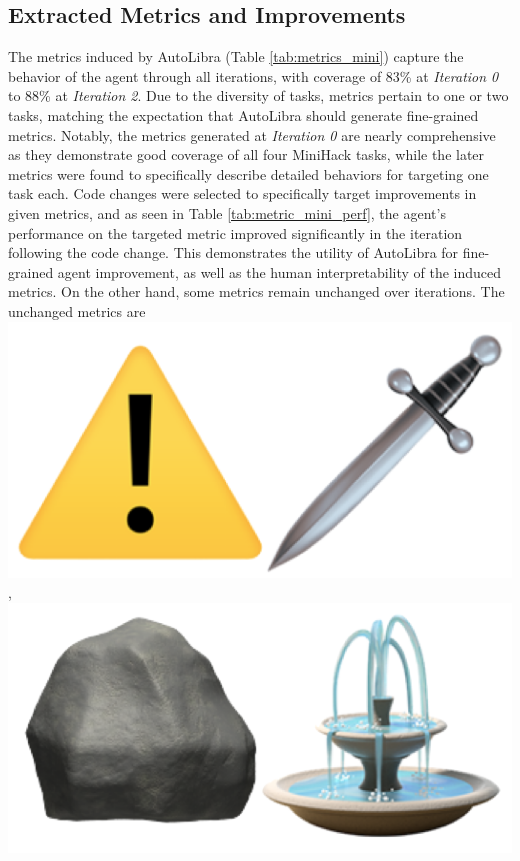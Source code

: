 \begin{flushleft}
	\subsection{Extracted Metrics and Improvements}
	The metrics induced by AutoLibra (Table \ref{tab:metrics_mini}) capture the behavior
	of the agent through all iterations, with coverage of 83\% at \emph{Iteration
	0} to 88\% at \emph{Iteration 2}. Due to the diversity of tasks, metrics
	pertain to one or two tasks, matching the expectation that AutoLibra should generate
	fine-grained metrics. Notably, the metrics generated at \emph{Iteration 0} are
	nearly comprehensive as they demonstrate good coverage of all four MiniHack
	tasks, while the later metrics were found to specifically describe detailed behaviors
	for targeting one task each. Code changes were selected to specifically target
	improvements in given metrics, and as seen in Table \ref{tab:metric_mini_perf},
	the agent's performance on the targeted metric improved significantly in the
	iteration following the code change. This demonstrates the utility of AutoLibra
	for fine-grained agent improvement, as well as the human interpretability of
	the induced metrics. On the other hand, some metrics remain unchanged over
	iterations. The unchanged metrics are
	\includegraphics[scale=0.05]{figs/emojis/mini_3.png}
	,
	\includegraphics[scale=0.05]{figs/emojis/mini_4.png}

\end{flushleft}
